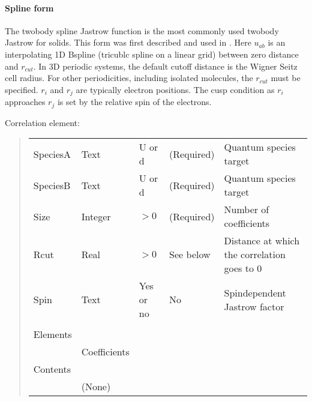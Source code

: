 \documentclass[letterpaper,10pt,english]{sphinxmanual}
\begin{document}
\paragraph{Spline form}
\label{\detokenize{intro_wavefunction:twobodyjastrowspline}}\label{\detokenize{intro_wavefunction:id9}}
The two\sphinxhyphen{}body spline Jastrow function is the most commonly used two\sphinxhyphen{}body
Jastrow for solids. This form was first described and used in
. Here
\(u_{ab}\) is an interpolating 1D B\sphinxhyphen{}spline (tricublc spline on a
linear grid) between zero distance and \(r_{cut}\). In 3D periodic
systems, the default cutoff distance is the Wigner Seitz cell radius.
For other periodicities, including isolated molecules, the
\(r_{cut}\) must be specified. \(r_i\) and \(r_j\) are
typically electron positions. The cusp condition as \(r_i\)
approaches \(r_j\) is set by the relative spin of the electrons.

Correlation element:
\begin{quote}


\begin{savenotes}\sphinxattablestart
\centering
\begin{tabulary}{\linewidth}[t]{|T|T|T|T|T|}
\hline

&
&
&
&
\\
\hline
SpeciesA
&
Text
&
U or d
&
(Required)
&
Quantum
species
target
\\
\hline
SpeciesB
&
Text
&
U or d
&
(Required)
&
Quantum
species
target
\\
\hline
Size
&
Integer
&
\(> 0\)
&
(Required)
&
Number of
coefficients
\\
\hline
Rcut
&
Real
&
\(> 0\)
&
See below
&
Distance at
which the
correlation
goes to 0
\\
\hline
Spin
&
Text
&
Yes or no
&
No
&
Spin\sphinxhyphen{}dependent
Jastrow factor
\\
\hline&&&&\\
\hline
Elements
&&&&\\
\hline&
Coefficients
&&&\\
\hline
Contents
&&&&\\
\hline&
(None)
&&&\\
\hline
\end{tabulary}
\par
\sphinxattableend\end{savenotes}
\end{quote}
\end{document}
